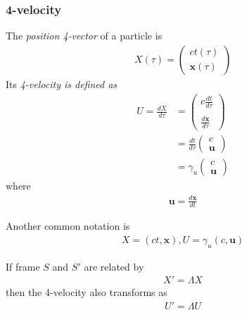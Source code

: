 \documentclass[a4paper]{article}
\begin{document}
\subsubsection{4-velocity}
The \emph{position 4-vector} of a particle is
\begin{equation*}
\begin{aligned}
X\left(\tau\right) = \left(\begin{matrix}
ct\left(\tau\right)\\
\mathbf{x}\left(\tau\right)
\end{matrix}\right)
\end{aligned}
\end{equation*}
Its \emph{4-velocity is defined as}
\begin{equation*}
\begin{aligned}
U = \frac{dX}{d\tau} &= \left(\begin{matrix}
c\frac{dt}{d\tau}\\\\
\frac{d\mathbf{x}}{d\tau}
\end{matrix}\right)\\
&= \frac{dt}{d\tau} \left(\begin{matrix}
c\\
\mathbf{u}
\end{matrix}\right)\\
&=\gamma_u\left(\begin{matrix}
c\\
\mathbf{u}
\end{matrix}\right)
\end{aligned}
\end{equation*}
where 
\begin{equation*}
\begin{aligned}
\mathbf{u} = \frac{d\mathbf{x}}{dt}
\end{aligned}
\end{equation*}

Another common notation is
\begin{equation*}
\begin{aligned}
X=\left(ct,\mathbf{x}\right), U=\gamma_u\left(c,\mathbf{u}\right)
\end{aligned}
\end{equation*}

If frame $S$ and $S'$ are related by
\begin{equation*}
\begin{aligned}
X' = \Lambda X
\end{aligned}
\end{equation*}
then the 4-velocity also transforms as
\begin{equation*}
\begin{aligned}
U' = \Lambda U
\end{aligned}
\end{equation*}
\end{document}
